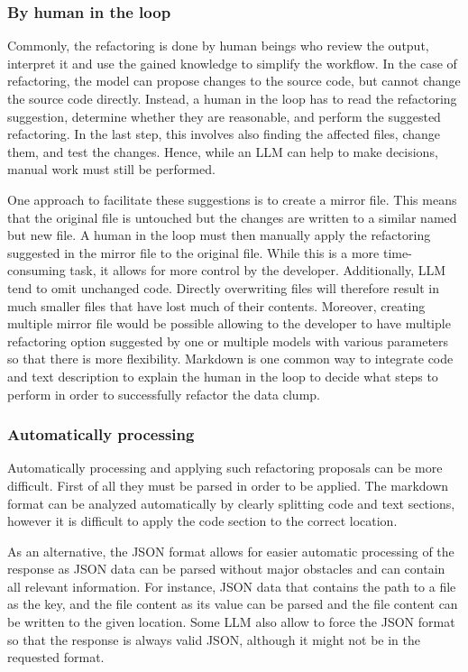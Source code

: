 \subsubsection{By human in the loop}
Commonly, the refactoring is done by human beings who review the output, interpret it and use the gained knowledge to simplify the workflow. In the case of refactoring, the model can propose changes to the source code, but cannot change the source code directly. Instead, a human in the loop has to read the refactoring suggestion, determine whether they are reasonable, and perform the suggested refactoring. In the last step, this involves also finding the affected files, change them, and test the changes. Hence, while an \ac{LLM} can help to make decisions, manual work must still be performed. 

One approach to facilitate these suggestions is to create a mirror file. This means that the original file is untouched but the changes are written to a similar named but new file. A human in the loop must then manually apply the refactoring suggested in the mirror file to the original file. While this is a more time-consuming task, it allows for more control by the developer. Additionally, \acs{LLM} tend to omit unchanged code. Directly overwriting files will therefore result in much smaller files that have lost much of their contents. Moreover, creating multiple mirror file would be possible allowing to the developer to have multiple refactoring option suggested by one or multiple models with various parameters so that there is more flexibility. 
Markdown is one common way to integrate code and text description to explain the human in the loop to decide what steps to perform in order to successfully refactor the data clump.  

\subsubsection{Automatically processing}

Automatically processing and applying such refactoring proposals can be more difficult.
First of all they must be parsed in order to be applied. The markdown format can be analyzed automatically by clearly splitting code and text sections, however it is difficult to apply the code section to the correct location. 

As an alternative, the \ac{JSON} format allows for easier automatic processing of the response as \ac{JSON} data can be parsed without major obstacles and can contain all relevant information. For instance, \ac{JSON} data that contains the path to a file as the key, and the file content as its value can be parsed and the file content can be written to the given location. Some \acs{LLM} also allow to force the \ac{JSON} format so that the response is always valid \ac{JSON}, although it might not be in the requested format. 

